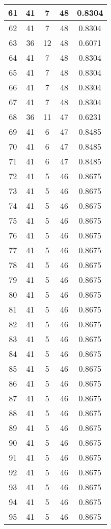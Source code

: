 \documentclass[letterpaper, 12pt]{article}
\begin{document}
\begin{longtable}{|c|c|c|c|c|}
61 & 41 & 7 & 48 & 0.8304 \\
\hline
62 & 41 & 7 & 48 & 0.8304 \\
\hline
63 & 36 & 12 & 48 & 0.6071 \\
\hline
64 & 41 & 7 & 48 & 0.8304 \\
\hline
65 & 41 & 7 & 48 & 0.8304 \\
\hline
66 & 41 & 7 & 48 & 0.8304 \\
\hline
67 & 41 & 7 & 48 & 0.8304 \\
\hline
68 & 36 & 11 & 47 & 0.6231 \\
\hline
69 & 41 & 6 & 47 & 0.8485 \\
\hline
70 & 41 & 6 & 47 & 0.8485 \\
\hline
71 & 41 & 6 & 47 & 0.8485 \\
\hline
72 & 41 & 5 & 46 & 0.8675 \\
\hline
73 & 41 & 5 & 46 & 0.8675 \\
\hline
74 & 41 & 5 & 46 & 0.8675 \\
\hline
75 & 41 & 5 & 46 & 0.8675 \\
\hline
76 & 41 & 5 & 46 & 0.8675 \\
\hline
77 & 41 & 5 & 46 & 0.8675 \\
\hline
78 & 41 & 5 & 46 & 0.8675 \\
\hline
79 & 41 & 5 & 46 & 0.8675 \\
\hline
80 & 41 & 5 & 46 & 0.8675 \\
\hline
81 & 41 & 5 & 46 & 0.8675 \\
\hline
82 & 41 & 5 & 46 & 0.8675 \\
\hline
83 & 41 & 5 & 46 & 0.8675 \\
\hline
84 & 41 & 5 & 46 & 0.8675 \\
\hline
85 & 41 & 5 & 46 & 0.8675 \\
\hline
86 & 41 & 5 & 46 & 0.8675 \\
\hline
87 & 41 & 5 & 46 & 0.8675 \\
\hline
88 & 41 & 5 & 46 & 0.8675 \\
\hline
89 & 41 & 5 & 46 & 0.8675 \\
\hline
90 & 41 & 5 & 46 & 0.8675 \\
\hline
91 & 41 & 5 & 46 & 0.8675 \\
\hline
92 & 41 & 5 & 46 & 0.8675 \\
\hline
93 & 41 & 5 & 46 & 0.8675 \\
\hline
94 & 41 & 5 & 46 & 0.8675 \\
\hline
95 & 41 & 5 & 46 & 0.8675 \\

\end{longtable}
\end{document}
